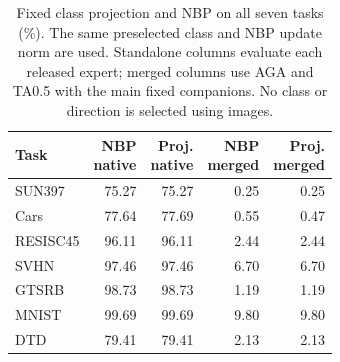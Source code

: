 \begin{table}[!htbp]
\centering
\small
\setlength{\tabcolsep}{4pt}
\caption{Fixed class projection and NBP on all seven tasks (\%). The same preselected class and NBP update norm are used. Standalone columns evaluate each released expert; merged columns use AGA and TA0.5 with the main fixed companions. No class or direction is selected using images.}
\label{tab:class-projection}
\begin{tabular}{lrrrr}
\toprule
Task & \shortstack{NBP\\native} & \shortstack{Proj.\\native} & \shortstack{NBP\\merged} & \shortstack{Proj.\\merged} \\
\midrule
SUN397 & 75.27 & 75.27 & 0.25 & 0.25 \\
Cars & 77.64 & 77.69 & 0.55 & 0.47 \\
RESISC45 & 96.11 & 96.11 & 2.44 & 2.44 \\
SVHN & 97.46 & 97.46 & 6.70 & 6.70 \\
GTSRB & 98.73 & 98.73 & 1.19 & 1.19 \\
MNIST & 99.69 & 99.69 & 9.80 & 9.80 \\
DTD & 79.41 & 79.41 & 2.13 & 2.13 \\
\bottomrule
\end{tabular}
\end{table}
